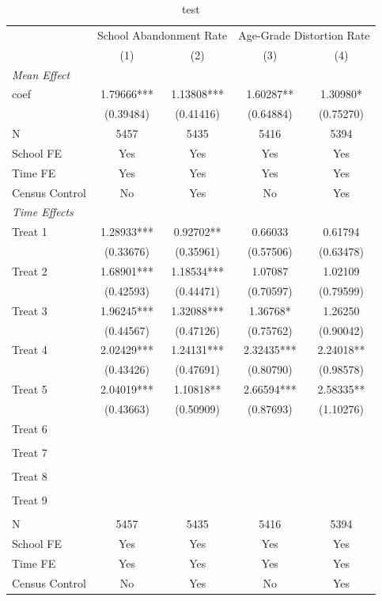 \begin{table}[!htbp]
\centering
\caption{test}
\label{tab:test}
\begin{tabular}{lcccc}
\hline
 & \multicolumn{2}{c}{School Abandonment Rate} & \multicolumn{2}{c}{Age-Grade Distortion Rate} \\
 & (1) & (2) & (3) & (4) \\
\hline
\multicolumn{5}{l}{\textit{Mean Effect}} \\
coef & 1.79666*** & 1.13808*** & 1.60287** & 1.30980* \\
   & (0.39484) & (0.41416) & (0.64884) & (0.75270) \\
N & 5457 & 5435 & 5416 & 5394 \\
School FE & Yes & Yes & Yes & Yes \\
Time FE & Yes & Yes & Yes & Yes \\
Census Control & No & Yes & No & Yes \\
\hline
\multicolumn{5}{l}{\textit{Time Effects}} \\
Treat 1 & 1.28933*** & 0.92702** & 0.66033 & 0.61794 \\
 & (0.33676) & (0.35961) & (0.57506) & (0.63478) \\
Treat 2 & 1.68901*** & 1.18534*** & 1.07087 & 1.02109 \\
 & (0.42593) & (0.44471) & (0.70597) & (0.79599) \\
Treat 3 & 1.96245*** & 1.32088*** & 1.36768* & 1.26250 \\
 & (0.44567) & (0.47126) & (0.75762) & (0.90042) \\
Treat 4 & 2.02429*** & 1.24131*** & 2.32435*** & 2.24018** \\
 & (0.43426) & (0.47691) & (0.80790) & (0.98578) \\
Treat 5 & 2.04019*** & 1.10818** & 2.66594*** & 2.58335** \\
 & (0.43663) & (0.50909) & (0.87693) & (1.10276) \\
Treat 6 &  &  &  &  \\
 &  &  &  &  \\
Treat 7 &  &  &  &  \\
 &  &  &  &  \\
Treat 8 &  &  &  &  \\
 &  &  &  &  \\
Treat 9 &  &  &  &  \\
 &  &  &  &  \\
N & 5457 & 5435 & 5416 & 5394 \\
School FE & Yes & Yes & Yes & Yes \\
Time FE & Yes & Yes & Yes & Yes \\
Census Control & No & Yes & No & Yes \\
\hline
\end{tabular}
\end{table}
